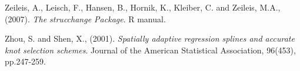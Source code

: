\documentclass[submit]{smj}
\begin{document}
\begin{thebibliography}{99}
Zeileis, A., Leisch, F., Hansen, B., Hornik, K., Kleiber, C. and Zeileis, M.A., (2007). 
\textit{The strucchange Package}.
R manual.

Zhou, S. and Shen, X., (2001). 
\textit{Spatially adaptive regression splines and accurate knot selection schemes}.
Journal of the American Statistical Association, 96(453), pp.247-259.

\end{thebibliography}
\end{document}
